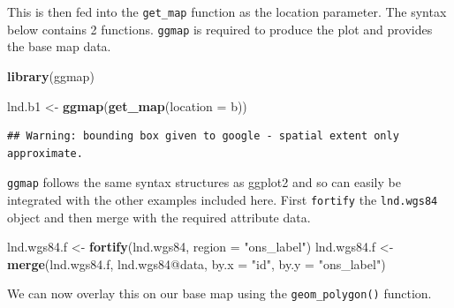 \documentclass[]{article}
\newenvironment{Shaded}{}{}
\newcommand{\KeywordTok}[1]{\textcolor[rgb]{0.00,0.44,0.13}{\textbf{{#1}}}}
\newcommand{\DataTypeTok}[1]{\textcolor[rgb]{0.56,0.13,0.00}{{#1}}}
\newcommand{\DecValTok}[1]{\textcolor[rgb]{0.25,0.63,0.44}{{#1}}}
\newcommand{\FloatTok}[1]{\textcolor[rgb]{0.25,0.63,0.44}{{#1}}}
\newcommand{\StringTok}[1]{\textcolor[rgb]{0.25,0.44,0.63}{{#1}}}
\newcommand{\CommentTok}[1]{\textcolor[rgb]{0.38,0.63,0.69}{\textit{{#1}}}}
\newcommand{\NormalTok}[1]{{#1}}
\begin{document}
\begin{Shaded}
\end{Shaded}
This is then fed into the \texttt{get\_map} function as the location
parameter. The syntax below contains 2 functions. \texttt{ggmap} is
required to produce the plot and provides the base map data.

\begin{Shaded}
\begin{Highlighting}[]
\KeywordTok{library}\NormalTok{(ggmap)}

\NormalTok{lnd.b1 <- }\KeywordTok{ggmap}\NormalTok{(}\KeywordTok{get_map}\NormalTok{(}\DataTypeTok{location =} \NormalTok{b))}
\end{Highlighting}
\end{Shaded}
\begin{verbatim}
## Warning: bounding box given to google - spatial extent only approximate.
\end{verbatim}
\texttt{ggmap} follows the same syntax structures as ggplot2 and so can
easily be integrated with the other examples included here. First
\texttt{fortify} the \texttt{lnd.wgs84} object and then merge with the
required attribute data.

\begin{Shaded}
\begin{Highlighting}[]
\NormalTok{lnd.wgs84.f <- }\KeywordTok{fortify}\NormalTok{(lnd.wgs84, }\DataTypeTok{region =} \StringTok{"ons_label"}\NormalTok{)}
\NormalTok{lnd.wgs84.f <- }\KeywordTok{merge}\NormalTok{(lnd.wgs84.f, lnd.wgs84@data, }\DataTypeTok{by.x =} \StringTok{"id"}\NormalTok{, }\DataTypeTok{by.y =} \StringTok{"ons_label"}\NormalTok{)}
\end{Highlighting}
\end{Shaded}
We can now overlay this on our base map using the
\texttt{geom\_polygon()} function.
\end{document}
